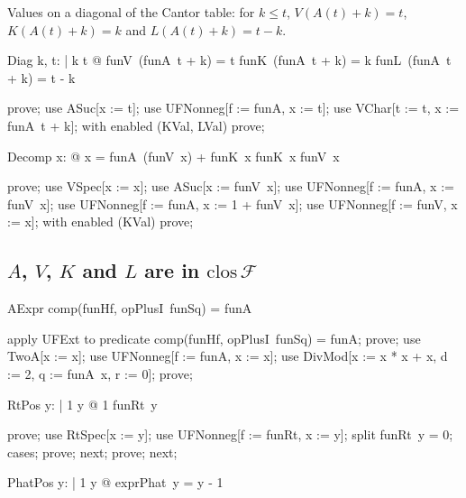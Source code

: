 \documentclass{article}
\begin{document}
Values on a diagonal of the Cantor table: for $k \le t$, $V(A(t)+k) = t$, $K(A(t)+k) = k$ and
$L(A(t)+k) = t - k$.

\begin{theorem}{Diag}
  \forall k, t: \nat | k \leq t @
    funV~(funA~t + k) = t \land funK~(funA~t + k) = k \land funL~(funA~t + k) = t - k
\end{theorem}

\begin{zproof}
prove;
use ASuc[x := t];
use UFNonneg[f := funA, x := t];
use VChar[t := t, x := funA~t + k];
with enabled (KVal, LVal) prove;
\end{zproof}

\begin{theorem}{Decomp}
  \forall x: \nat @ x = funA~(funV~x) + funK~x \land funK~x \leq funV~x
\end{theorem}

\begin{zproof}
prove;
use VSpec[x := x];
use ASuc[x := funV~x];
use UFNonneg[f := funA, x := funV~x];
use UFNonneg[f := funA, x := 1 + funV~x];
use UFNonneg[f := funV, x := x];
with enabled (KVal) prove;
\end{zproof}

\subsection{$A$, $V$, $K$ and $L$ are in $\mathrm{clos}\,\mathcal{F}$}

\begin{theorem}{AExpr}
  comp(funHf, opPlusI~funSq) = funA
\end{theorem}

\begin{zproof}
apply UFExt to predicate comp(funHf, opPlusI~funSq) = funA;
prove;
use TwoA[x := x];
use UFNonneg[f := funA, x := x];
use DivMod[x := x * x + x, d := 2, q := funA~x, r := 0];
prove;
\end{zproof}

\begin{theorem}{RtPos}
  \forall y: \nat | 1 \leq y @ 1 \leq funRt~y
\end{theorem}

\begin{zproof}
prove;
use RtSpec[x := y];
use UFNonneg[f := funRt, x := y];
split funRt~y = 0;
cases;
prove;
next;
prove;
next;
\end{zproof}

\begin{theorem}{PhatPos}
  \forall y: \nat | 1 \leq y @ exprPhat~y = y - 1
\end{theorem}
\end{document}
